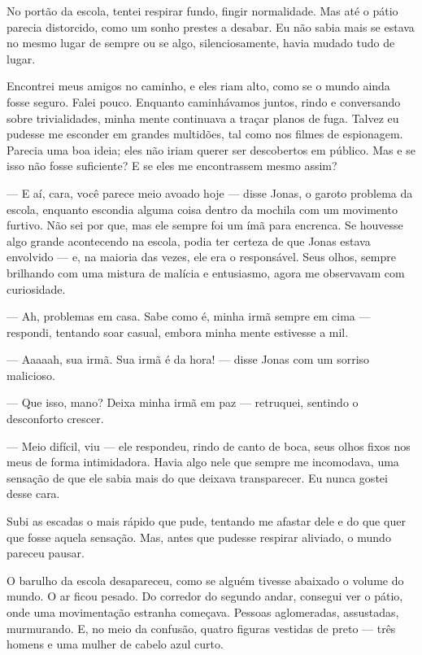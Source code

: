No portão da escola, tentei respirar fundo, fingir normalidade.  
Mas até o pátio parecia distorcido, como um sonho prestes a desabar.  
Eu não sabia mais se estava no mesmo lugar de sempre ou se algo, silenciosamente, havia mudado tudo de lugar.

Encontrei meus amigos no caminho, e eles riam alto, como se o mundo ainda fosse seguro.  
Falei pouco.  
Enquanto caminhávamos juntos, rindo e conversando sobre trivialidades, minha mente continuava a traçar planos de fuga.  
Talvez eu pudesse me esconder em grandes multidões, tal como nos filmes de espionagem. Parecia uma boa ideia; eles não iriam querer ser descobertos em público.  
Mas e se isso não fosse suficiente? E se eles me encontrassem mesmo assim?

— E aí, cara, você parece meio avoado hoje — disse Jonas, o garoto problema da escola, enquanto escondia alguma coisa dentro da mochila com um movimento furtivo.  
Não sei por que, mas ele sempre foi um ímã para encrenca. Se houvesse algo grande acontecendo na escola, podia ter certeza de que Jonas estava envolvido — e, na maioria das vezes, ele era o responsável. Seus olhos, sempre brilhando com uma mistura de malícia e entusiasmo, agora me observavam com curiosidade.

— Ah, problemas em casa. Sabe como é, minha irmã sempre em cima — respondi, tentando soar casual, embora minha mente estivesse a mil.

— Aaaaah, sua irmã. Sua irmã é da hora! — disse Jonas com um sorriso malicioso.

— Que isso, mano? Deixa minha irmã em paz — retruquei, sentindo o desconforto crescer.

— Meio difícil, viu — ele respondeu, rindo de canto de boca, seus olhos fixos nos meus de forma intimidadora. Havia algo nele que sempre me incomodava, uma sensação de que ele sabia mais do que deixava transparecer. Eu nunca gostei desse cara.

Subi as escadas o mais rápido que pude, tentando me afastar dele e do que quer que fosse aquela sensação.  
Mas, antes que pudesse respirar aliviado, o mundo pareceu pausar.

O barulho da escola desapareceu, como se alguém tivesse abaixado o volume do mundo.  
O ar ficou pesado.  
Do corredor do segundo andar, consegui ver o pátio, onde uma movimentação estranha começava.  
Pessoas aglomeradas, assustadas, murmurando.  
E, no meio da confusão, quatro figuras vestidas de preto — três homens e uma mulher de cabelo azul curto.

